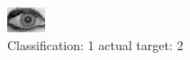 \begin{figure}[h!]
\begin{center}
\includegraphics[width=0.60\columnwidth]{figures/ID2006_class_1_target_2.png}
\end{center}
\caption{ Classification: 1 actual target: 2}
\label{fig:ID2006_class_1_target_2}
\end{figure}
